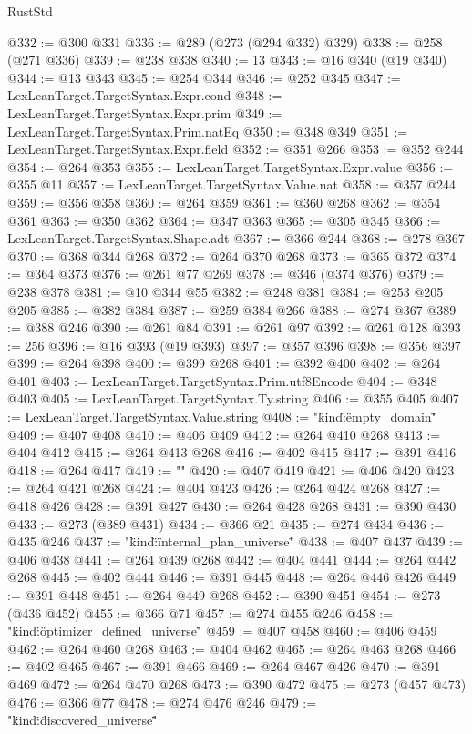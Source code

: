 \begin{lexlean}{RustStd}
\begin{coremodule}
@332 := @300 @331
@336 := @289 (@273 (@294 @332) @329)
@338 := @258 (@271 @336)
@339 := @238 @338
@340 := 13
@343 := @16 @340 (@19 @340)
@344 := @13 @343
@345 := @254 @344
@346 := @252 @345
@347 := LexLeanTarget.TargetSyntax.Expr.cond
@348 := LexLeanTarget.TargetSyntax.Expr.prim
@349 := LexLeanTarget.TargetSyntax.Prim.natEq
@350 := @348 @349
@351 := LexLeanTarget.TargetSyntax.Expr.field
@352 := @351 @266
@353 := @352 @244
@354 := @264 @353
@355 := LexLeanTarget.TargetSyntax.Expr.value
@356 := @355 @11
@357 := LexLeanTarget.TargetSyntax.Value.nat
@358 := @357 @244
@359 := @356 @358
@360 := @264 @359
@361 := @360 @268
@362 := @354 @361
@363 := @350 @362
@364 := @347 @363
@365 := @305 @345
@366 := LexLeanTarget.TargetSyntax.Shape.adt
@367 := @366 @244
@368 := @278 @367
@370 := @368 @344 @268
@372 := @264 @370 @268
@373 := @365 @372
@374 := @364 @373
@376 := @261 @77 @269
@378 := @346 (@374 @376)
@379 := @238 @378
@381 := @10 @344 @55
@382 := @248 @381
@384 := @253 @205 @205
@385 := @382 @384
@387 := @259 @384 @266
@388 := @274 @367
@389 := @388 @246
@390 := @261 @84
@391 := @261 @97
@392 := @261 @128
@393 := 256
@396 := @16 @393 (@19 @393)
@397 := @357 @396
@398 := @356 @397
@399 := @264 @398
@400 := @399 @268
@401 := @392 @400
@402 := @264 @401
@403 := LexLeanTarget.TargetSyntax.Prim.utf8Encode
@404 := @348 @403
@405 := LexLeanTarget.TargetSyntax.Ty.string
@406 := @355 @405
@407 := LexLeanTarget.TargetSyntax.Value.string
@408 := "{\"kind\":\"empty_domain\""
@409 := @407 @408
@410 := @406 @409
@412 := @264 @410 @268
@413 := @404 @412
@415 := @264 @413 @268
@416 := @402 @415
@417 := @391 @416
@418 := @264 @417
@419 := "}"
@420 := @407 @419
@421 := @406 @420
@423 := @264 @421 @268
@424 := @404 @423
@426 := @264 @424 @268
@427 := @418 @426
@428 := @391 @427
@430 := @264 @428 @268
@431 := @390 @430
@433 := @273 (@389 @431)
@434 := @366 @21
@435 := @274 @434
@436 := @435 @246
@437 := "{\"kind\":\"internal_plan_universe\""
@438 := @407 @437
@439 := @406 @438
@441 := @264 @439 @268
@442 := @404 @441
@444 := @264 @442 @268
@445 := @402 @444
@446 := @391 @445
@448 := @264 @446 @426
@449 := @391 @448
@451 := @264 @449 @268
@452 := @390 @451
@454 := @273 (@436 @452)
@455 := @366 @71
@457 := @274 @455 @246
@458 := "{\"kind\":\"optimizer_defined_universe\""
@459 := @407 @458
@460 := @406 @459
@462 := @264 @460 @268
@463 := @404 @462
@465 := @264 @463 @268
@466 := @402 @465
@467 := @391 @466
@469 := @264 @467 @426
@470 := @391 @469
@472 := @264 @470 @268
@473 := @390 @472
@475 := @273 (@457 @473)
@476 := @366 @77
@478 := @274 @476 @246
@479 := "{\"kind\":\"discovered_universe\""
}}}
\end{coremodule}
\end{lexlean}
